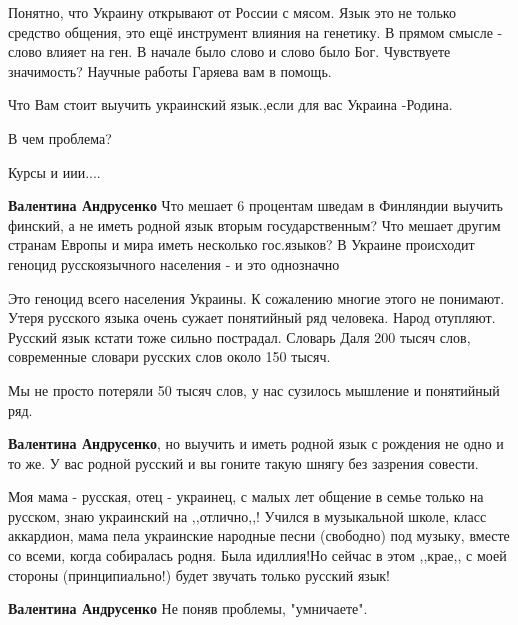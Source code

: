 \begin{itemize}
Понятно, что Украину открывают от России с мясом. Язык это не только средство
общения, это ещё инструмент влияния на генетику. В прямом смысле - слово влияет
на ген. В начале было слово и слово было Бог. Чувствуете значимость? Научные
работы Гаряева вам в помощь.


Что Вам стоит выучить украинский язык.,если для вас Украина -Родина.

В чем проблема?

Курсы и иии....

\begin{itemize}
\textbf{Валентина Андрусенко} Что мешает 6 процентам шведам в Финляндии выучить финский, а не иметь родной язык вторым государственным? Что мешает другим странам Европы и мира иметь несколько гос.языков? В Украине происходит геноцид русскоязычного населения - и это однозначно



Это геноцид всего населения Украины. К сожалению многие этого не понимают.
Утеря русского языка очень сужает понятийный ряд человека. Народ отупляют.
Русский язык кстати тоже сильно пострадал. Словарь Даля 200 тысяч слов,
современные словари русских слов около 150 тысяч. 

Мы не просто потеряли 50 тысяч слов, у нас сузилось мышление и понятийный ряд.


\textbf{Валентина Андрусенко}, но выучить и иметь родной язык с рождения не
одно и то же. У вас родной русский и вы гоните такую шнягу без зазрения
совести.


Моя мама - русская, отец - украинец, с малых лет общение в семье только на
русском, знаю украинский на ,,отлично,,! Учился в музыкальной школе, класс
аккардион, мама пела украинские народные песни (свободно) под музыку, вместе со
всеми, когда собиралась родня. Была идиллия!Но сейчас в этом ,,крае,, с моей
стороны (принципиально!) будет звучать только русский язык!


\textbf{Валентина Андрусенко} Не поняв проблемы, "умничаете".


\end{itemize}
\end{itemize}
